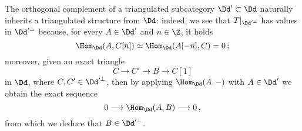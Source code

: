 \begin{rmk}
    The orthogonal complement of a triangulated subcategory $\Dd' \subset \Dd$
    naturally inherits a triangulated structure from $\Dd$: 
    indeed, we see that $T\vert_{\Dd'^{\perp}}$ has values in $\Dd'^{\perp}$
    because, for every $A \in \Dd'$ and $n \in \Z$, it holds
    \begin{equation*}
        \Hom_{\Dd}(A,C[n]) \simeq \Hom_{\Dd}(A[-n],C) = 0\,;
    \end{equation*}
    moreover, given an exact triangle
    \begin{equation*}
        C \longrightarrow C' \longrightarrow B \longrightarrow C[1]
    \end{equation*}
    in $\Dd$, where $C,C' \in \Dd'^{\perp}$, then by applying $\Hom_{\Dd}(A,-)$
    with $A \in \Dd'$ we obtain the exact sequence
    \begin{equation*}
        0 \longrightarrow \Hom_{\Dd}(A,B) \longrightarrow 0\,,
    \end{equation*}
    from which we deduce that $B \in \Dd'^{\perp}$.
\end{rmk}

